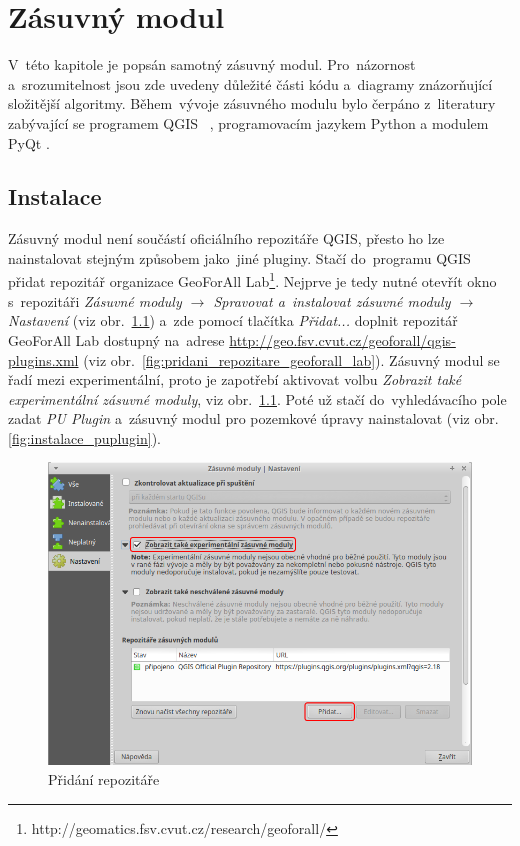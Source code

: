 \chapter{Zásuvný modul}
\label{4-plugin}

V~této kapitole je popsán samotný zásuvný modul. Pro~názornost a~srozumitelnost jsou zde uvedeny důležité části kódu a~diagramy znázorňující složitější algoritmy. Během~vývoje zásuvného modulu bylo čerpáno z~literatury zabývající se programem QGIS \citep{pyqgis_book}~\citep{qgis_book}, programovacím jazykem Python \citep{dive_into_python} \citep{python3_oop_book} a modulem PyQt \citep{pyqt_book}.

\section{Instalace}
\label{instalace}

Zásuvný modul není součástí oficiálního repozitáře QGIS, přesto ho lze nainstalovat stejným způsobem jako~jiné pluginy. Stačí do~programu QGIS přidat repozitář organizace GeoForAll Lab\footnote{http://geomatics.fsv.cvut.cz/research/geoforall/}. Nejprve je tedy nutné otevřít okno s~repozitáři \textit{Zásuvné moduly $\rightarrow$ Spravovat a~instalovat zásuvné moduly $\rightarrow$ Nastavení} (viz obr.~\ref{fig:pridani_repozitare}) a~zde pomocí tlačítka \textit{Přidat...} doplnit repozitář GeoForAll Lab dostupný na~adrese \url{http://geo.fsv.cvut.cz/geoforall/qgis-plugins.xml} (viz obr.~\ref{fig:pridani_repozitare_geoforall_lab}). Zásuvný modul se řadí mezi experimentální, proto je zapotřebí aktivovat volbu \textit{Zobrazit také experimentální zásuvné moduly}, viz obr.~\ref{fig:pridani_repozitare}. Poté už stačí do~vyhledávacího pole zadat \textit{PU Plugin} a~zásuvný modul pro pozemkové úpravy nainstalovat (viz obr. \ref{fig:instalace_puplugin}).

	\begin{figure}[H]
		\centering
		\includegraphics[width=.8\textwidth]{./pictures/pridani_repozitare.png}
		\caption[Přidání repozitáře]{Přidání repozitáře}
		\label{fig:pridani_repozitare}
 	\end{figure}
 	

